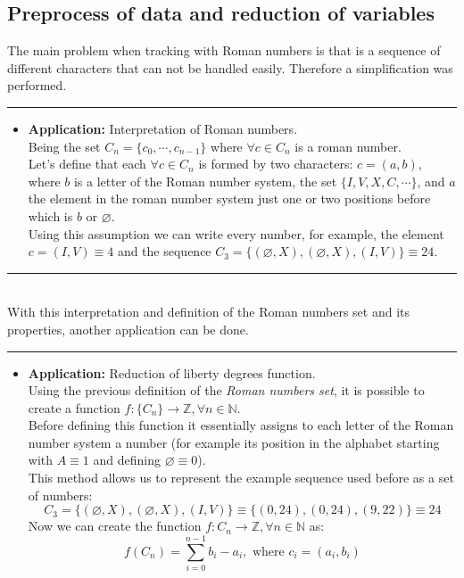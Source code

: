 \documentclass[a4paper, 11pt]{article}
\begin{document}
\subsection{Preprocess of data and reduction of variables}
The main problem when tracking with Roman numbers is that is a sequence of different characters that can not be handled easily. Therefore a simplification was performed.\\
\rule{\linewidth}{0.4pt}
    \begin{itemize}
        \item \textbf{Application:} Interpretation of Roman numbers.\\
 Being the set $C_n = \{c_0, \cdots, c_{n-1} \}$ where $\forall c \in C_n$ is a roman number.\\ 
 Let's define that each $\forall c \in C_n$ is formed by two characters: $c = (a,b)$, where $b$ is a letter of the Roman number system, the set $\{I, V, X, C, \cdots \}$, and $a$ the element in the roman number system just one or two positions before which is $b$ or $\varnothing$.\\
 Using this assumption we can write every number, for example, the element\\
        $c = (I,V) \equiv 4$ and the sequence $C_3 = \{ (\varnothing, X), (\varnothing, X), (I,V) \} \equiv 24$.
    \end{itemize}
\rule{\linewidth}{0.4pt}\\
With this interpretation and definition of the Roman numbers set and its properties, another application can be done.
\newpage
\hspace{-1.3em}\rule{\linewidth}{0.4pt}
    \begin{itemize}
        \item \textbf{Application:} Reduction of liberty degrees function.\\
 Using the previous definition of the \textit{Roman numbers set}, it is possible to create a function $f:\{C_n\}\rightarrow \mathbb{Z}, \forall n \in \mathbb{N}$.\\
 Before defining this function it essentially assigns to each letter of the Roman number system a number (for example its position in the alphabet starting with $A\equiv1$ and defining $\varnothing \equiv 0$).\\
 This method allows us to represent the example sequence used before as a set of numbers: 
        $$C_3 = \{ (\varnothing, X), (\varnothing, X), (I,V) \} \equiv \{ (0,24), (0,24), (9,22) \} \equiv 24$$
 Now we can create the function $f:C_n\rightarrow \mathbb{Z}, \forall n \in \mathbb{N}$ as:
        $$ f(C_n) = \sum_{i = 0}^{n-1} b_i-a_i, \text{ where } c_i = (a_i, b_i) $$
    \end{itemize}
\end{document}
